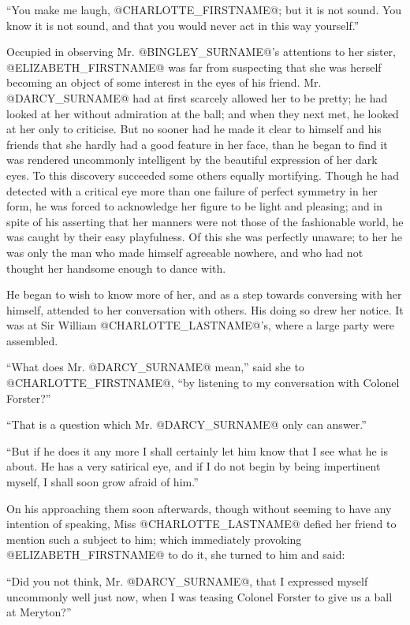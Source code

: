 ``You make me laugh, @CHARLOTTE_FIRSTNAME@; but it is not sound. You know it is not
sound, and that you would never act in this way yourself.''

Occupied in observing Mr. @BINGLEY_SURNAME@'s attentions to her sister, @ELIZABETH_FIRSTNAME@
was far from suspecting that she was herself becoming an object of some
interest in the eyes of his friend. Mr. @DARCY_SURNAME@ had at first scarcely
allowed her to be pretty; he had looked at her without admiration at the
ball; and when they next met, he looked at her only to criticise. But no
sooner had he made it clear to himself and his friends that she hardly
had a good feature in her face, than he began to find it was rendered
uncommonly intelligent by the beautiful expression of her dark eyes. To
this discovery succeeded some others equally mortifying. Though he had
detected with a critical eye more than one failure of perfect symmetry
in her form, he was forced to acknowledge her figure to be light and
pleasing; and in spite of his asserting that her manners were not those
of the fashionable world, he was caught by their easy playfulness. Of
this she was perfectly unaware; to her he was only the man who made
himself agreeable nowhere, and who had not thought her handsome enough
to dance with.

He began to wish to know more of her, and as a step towards conversing
with her himself, attended to her conversation with others. His doing so
drew her notice. It was at Sir William @CHARLOTTE_LASTNAME@'s, where a large party were
assembled.

``What does Mr. @DARCY_SURNAME@ mean,'' said she to @CHARLOTTE_FIRSTNAME@, ``by listening to my
conversation with Colonel Forster?''

``That is a question which Mr. @DARCY_SURNAME@ only can answer.''

``But if he does it any more I shall certainly let him know that I see
what he is about. He has a very satirical eye, and if I do not begin by
being impertinent myself, I shall soon grow afraid of him.''

On his approaching them soon afterwards, though without seeming to have
any intention of speaking, Miss @CHARLOTTE_LASTNAME@ defied her friend to mention such
a subject to him; which immediately provoking @ELIZABETH_FIRSTNAME@ to do it, she
turned to him and said:

``Did you not think, Mr. @DARCY_SURNAME@, that I expressed myself uncommonly
well just now, when I was teasing Colonel Forster to give us a ball at
Meryton?''

